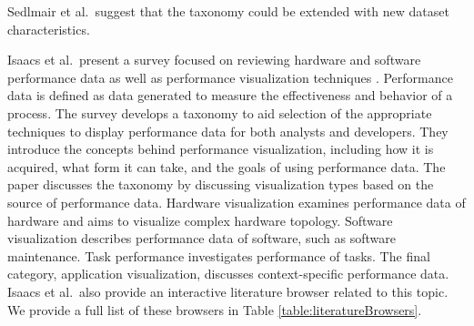 %


Sedlmair et al.\ suggest that the taxonomy could be extended with new dataset characteristics. 


Isaacs et al.\ present a survey focused on reviewing hardware and software performance data as well as performance visualization techniques \cite{isaacs2014state}. Performance data is defined as data generated to measure the effectiveness and behavior of a process. The survey develops a taxonomy to aid selection of the appropriate techniques to display performance data for both analysts and developers.
They introduce the concepts behind performance visualization, including how it is acquired, what form it can take, and the goals of using performance data. The paper discusses the taxonomy by discussing visualization types based on the source of performance data. Hardware visualization examines performance data of hardware and aims to visualize complex hardware topology. Software visualization describes performance data of software, such as software maintenance. Task performance investigates performance of tasks. The final category, application visualization, discusses context-specific performance data. Isaacs et al.\ also provide an interactive literature browser related to this topic. We provide a full list of these browsers in Table \ref{table:literatureBrowsers}.

